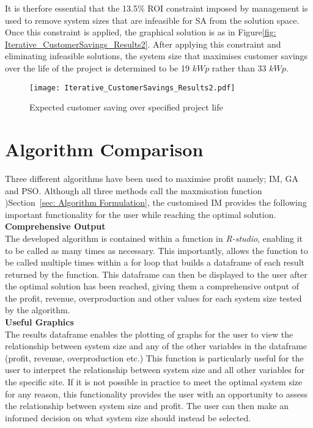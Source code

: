\documentclass[a4paper,11pt,fleqn]{report}
\begin{document}
It is therfore essential that the 13.5\% \ac{ROI} constraint imposed by management is used to remove system sizes that are infeasible for \ac{SA} from the solution space. Once this constraint is applied, the graphical solution is as in Figure\ref{fig: Iterative_CustomerSavings_Results2}. After applying this constraint and eliminating infeasible solutions, the system size that maximises customer savings over the life of the project is determined to be 19 $kWp$ rather than 33 $kWp$.

\begin{figure}[H]
\begin{center}
\texttt{[image: Iterative\_CustomerSavings\_Results2.pdf]}
\caption{Expected customer saving over specified project life}
\label{fig: Iterative_CustomerSavings_Results2)}
\end{center}
\end{figure}

\section{Algorithm Comparison} \label{sec: Algorithm Comparison}
Three different algorithms have been used to maximise profit namely; \ac{IM}, \ac{GA} and \ac{PSO}. Although all three methods call the maxmisation function )Section~\ref{sec: Algorithm Formulation}, the customised \ac{IM} provides the following important functionality for the user while reaching the optimal solution.\\

\noindent\textbf{Comprehensive Output}\\
The developed algorithm is contained within a function in \textit{R-studio}, enabling it to be called as many times as necessary. This importantly, allows the function to be called multiple times within a for loop that builds a dataframe of each result returned by the function. This dataframe can then be displayed to the user after the optimal solution has been reached, giving them a comprehensive output of the profit, revenue, overproduction and other values for each system size tested by the algorithm.\\

\noindent\textbf{Useful Graphics}\\
The results dataframe enables the plotting of graphs for the user to view the relationship between system size and any of the other variables in the dataframe (profit, revenue, overproduction etc.) This function is particularly useful for the user to interpret the relationship between system size and all other variables for the specific site. If it is not possible in practice to meet the optimal system size for any reason, this functionality provides the user with an opportunity to assess the relationship between system size and profit. The user can then make an informed decision on what system size should instead be selected.\\
\end{document}
